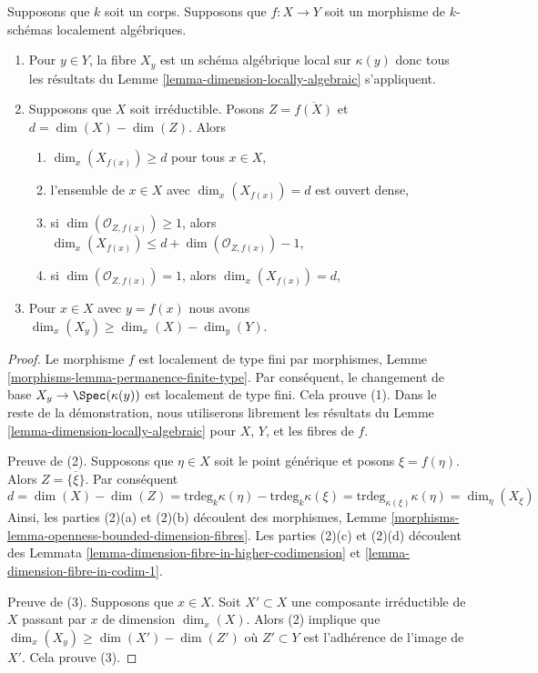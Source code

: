 \begin{lemma}
\label{lemma-dimension-fibres-locally-algebraic}
Supposons que $k$ soit un corps. Supposons que $f : X \to
Y$ soit un morphisme de $k$-schémas localement algébriques.
\begin{enumerate}
\item Pour $y \in Y$, la fibre $X_y$ est un schéma
algébrique local sur $\kappa(y)$ donc tous les résultats
du Lemme \ref{lemma-dimension-locally-algebraic}
s'appliquent. \item Supposons que $X$ soit irréductible.
Posons $Z = \overline{f(X)}$ et $d = \dim(X) - \dim(Z)$. Alors
\begin{enumerate}
\item $\dim_x(X_{f(x)}) \geq d$ pour tous $x \in X$, \item
l'ensemble de $x \in X$ avec $\dim_x(X_{f(x)}) = d$ est ouvert
dense, \item si $\dim(\mathcal{O}_{Z, f(x)}) \geq 1$, alors
$\dim_x(X_{f(x)}) \leq d + \dim(\mathcal{O}_{Z, f(x)}) - 1$, \item
si $\dim(\mathcal{O}_{Z, f(x)}) = 1$, alors $\dim_x(X_{f(x)}) = d$,
\end{enumerate}
\item Pour $x \in X$ avec $y = f(x)$ nous
avons $\dim_x(X_y) \geq \dim_x(X) - \dim_y(Y)$.
\end{enumerate}
\end{lemma}

\begin{proof}
Le morphisme $f$ est localement de type fini par
morphismes, Lemme
\ref{morphisms-lemma-permanence-finite-type}. Par conséquent,
le changement de base $X_y \to \Spec(\kappa(y))$ est localement
de type fini. Cela prouve (1). Dans le reste de la
démonstration, nous utiliserons librement les résultats du Lemme
\ref{lemma-dimension-locally-algebraic} pour $X$, $Y$, et les fibres de $f$.

\medskip\noindent
Preuve de (2). Supposons que $\eta \in X$ soit le point générique et
posons $\xi = f(\eta)$. Alors $Z = \overline{\{\xi\}}$. Par conséquent
$$
d = \dim(X) - \dim(Z) =
\text{trdeg}_k \kappa(\eta) - \text{trdeg}_k \kappa(\xi) =
\text{trdeg}_{\kappa(\xi)} \kappa(\eta) = \dim_\eta(X_\xi)
$$
Ainsi, les parties (2)(a) et (2)(b) découlent des
morphismes, Lemme
\ref{morphisms-lemma-openness-bounded-dimension-fibres}. Les
parties (2)(c) et (2)(d) découlent des Lemmata
\ref{lemma-dimension-fibre-in-higher-codimension} et \ref{lemma-dimension-fibre-in-codim-1}.

\medskip\noindent
Preuve de (3). Supposons que $x \in X$. Soit $X' \subset X$ une
composante irréductible de $X$ passant par $x$ de dimension
$\dim_x(X)$. Alors (2) implique que $\dim_x(X_y) \geq \dim(X') -
\dim(Z')$ où $Z' \subset Y$ est l'adhérence de l'image de $X'$. Cela prouve (3).
\end{proof}

